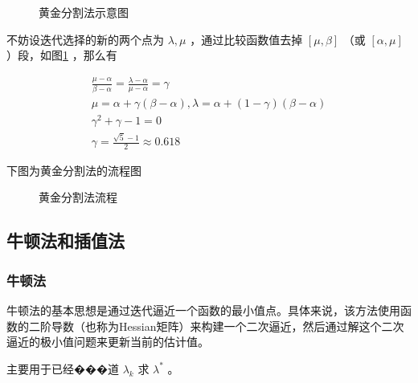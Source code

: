\documentclass{book}
\begin{document}
\begin{figure}[ht]
    \centering
    \caption{黄金分割法示意图}
    \label{fig:Golden section method}
\end{figure}

不妨设迭代选择的新的两个点为 $\lambda,\mu$ ，通过比较函数值去掉 $[\mu,\beta]$ （或 $[\alpha,\mu]$ ）段，如图\ref{fig:Golden section method} ，那么有

\begin{gather*}
    \frac{\mu-\alpha}{\beta-\alpha}=\frac{\lambda-\alpha}{\mu-\alpha}=\gamma       \\
    \mu=\alpha+\gamma(\beta-\alpha),\lambda=\alpha+(1-\gamma)(\beta-\alpha) \\
    \gamma^2+\gamma-1 =0                                       \\
    \gamma=\frac{\sqrt{5}-1}{2}\approx0.618
\end{gather*}

下图为黄金分割法的流程图

\begin{figure}[ht]
    \centering
    
    \caption{黄金分割法流程}
    \label{fig:flow of Golden section method}
\end{figure}

\subsection{牛顿法和插值法}

\subsubsection{牛顿法}

牛顿法的基本思想是通过迭代逼近一个函数的最小值点。具体来说，该方法使用函数的二阶导数（也称为Hessian矩阵）来构建一个二次逼近，然后通过解这个二次逼近的极小值问题来更新当前的估计值。

主要用于已经���道 $\lambda_k$ 求 $\lambda^*$ 。
\end{document}
